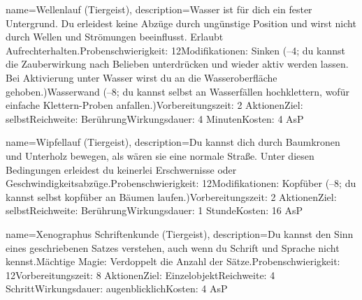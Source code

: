 {
    name={Wellenlauf (Tiergeist)},
    description={Wasser ist für dich ein fester Untergrund. Du erleidest keine Abzüge durch ungünstige Position und wirst nicht durch Wellen und Strömungen beeinflusst. Erlaubt Aufrechterhalten.\newline Probenschwierigkeit: 12\newline Modifikationen: Sinken (–4; du kannst die Zauberwirkung nach Belieben unterdrücken und wieder aktiv werden lassen. Bei Aktivierung unter Wasser wirst du an die Wasseroberfläche gehoben.)\newline Wasserwand (–8; du kannst selbst an Wasserfällen hochklettern, wofür einfache Klettern-Proben anfallen.)\newline Vorbereitungszeit: 2 Aktionen\newline Ziel: selbst\newline Reichweite: Berührung\newline Wirkungsdauer: 4 Minuten\newline Kosten: 4 AsP}
}


{
    name={Wipfellauf (Tiergeist)},
    description={Du kannst dich durch Baumkronen und Unterholz bewegen, als wären sie eine normale Straße. Unter diesen Bedingungen erleidest du keinerlei Erschwernisse oder Geschwindigkeitsabzüge.\newline Probenschwierigkeit: 12\newline Modifikationen: Kopfüber (–8; du kannst selbst kopfüber an Bäumen laufen.)\newline Vorbereitungszeit: 2 Aktionen\newline Ziel: selbst\newline Reichweite: Berührung\newline Wirkungsdauer: 1 Stunde\newline Kosten: 16 AsP}
}


{
    name={Xenographus Schriftenkunde (Tiergeist)},
    description={Du kannst den Sinn eines geschriebenen Satzes verstehen, auch wenn du Schrift und Sprache nicht kennst.\newline Mächtige Magie: Verdoppelt die Anzahl der Sätze.\newline Probenschwierigkeit: 12\newline Vorbereitungszeit: 8 Aktionen\newline Ziel: Einzelobjekt\newline Reichweite: 4 Schritt\newline Wirkungsdauer: augenblicklich\newline Kosten: 4 AsP}
}


